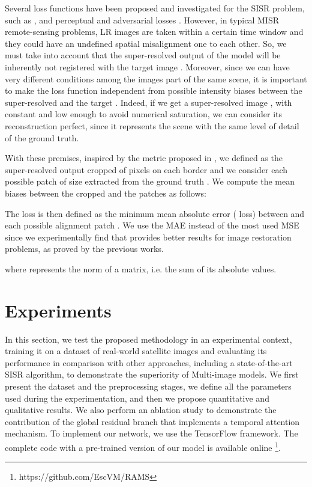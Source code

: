 \documentclass[journal]{IEEEtran}
\begin{document}
Several loss functions have been proposed and investigated for the SISR problem, such as  \cite{lai2017deep, lim2017enhanced, lai2018fast, yu2018wide},  \cite{molini2019deepsum, dong2015image, tai2017memnet, kim1990recursive} and perceptual and adversarial losses \cite{ledig2017photo, johnson2016perceptual}. However, in typical MISR remote-sensing problems, LR images are taken within a certain time window and they could have an undefined spatial misalignment one to each other. So, we must take into account that the super-resolved output of the model  will be inherently not registered with the target image . Moreover, since we can have very different conditions among the images part of the same scene, it is important to make the loss function independent from possible intensity biases between the super-resolved  and the target . Indeed, if we get a super-resolved image , with  constant and low enough to avoid numerical saturation, we can consider its reconstruction perfect, since it represents the scene with the same level of detail of the ground truth.

With these premises, inspired by the metric proposed in \cite{martens2019super}, we defined  as the super-resolved output cropped of  pixels on each border and we consider each possible patch  of size  extracted from the ground truth . We compute the mean biases between the cropped  and the patches  as follows:



The loss is then defined as the minimum mean absolute error ( loss) between  and each possible alignment patch . We use the MAE instead of the most used MSE since we experimentally find that provides better results for image restoration problems, as proved by the previous works\cite{zhao2016loss,lim2017enhanced,zhang2018image}.



\noindent where  represents the  norm of a matrix, i.e. the sum of its absolute values.



\section{Experiments} \label{experiments}
In this section, we test the proposed methodology in an experimental context, training it on a dataset of real-world satellite images and evaluating its performance in comparison with other approaches, including a state-of-the-art SISR algorithm, to demonstrate the superiority of Multi-image models. We first present the dataset and the preprocessing stages, we define all the parameters used during the experimentation, and then we propose quantitative and qualitative results. We also perform an ablation study to demonstrate the contribution of the global residual branch that implements a temporal attention mechanism. To implement our network, we use the TensorFlow framework. The complete code with a pre-trained version of our model is available online \footnote{https://github.com/EscVM/RAMS}.
\end{document}
